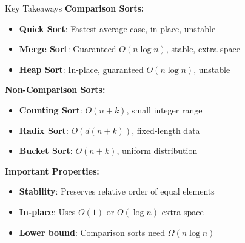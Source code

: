 \documentclass[aspectratio=169]{beamer}
\begin{document}
\begin{frame}{Key Takeaways}
  \textbf{Comparison Sorts:}
  \begin{itemize}
    \item \textbf{Quick Sort}: Fastest average case, in-place, unstable
    \item \textbf{Merge Sort}: Guaranteed $O(n \log n)$, stable, extra space
    \item \textbf{Heap Sort}: In-place, guaranteed $O(n \log n)$, unstable
  \end{itemize}

  \vspace{0.3cm}
  \textbf{Non-Comparison Sorts:}
  \begin{itemize}
    \item \textbf{Counting Sort}: $O(n + k)$, small integer range
    \item \textbf{Radix Sort}: $O(d(n + k))$, fixed-length data
    \item \textbf{Bucket Sort}: $O(n + k)$, uniform distribution
  \end{itemize}

  \vspace{0.3cm}
  \textbf{Important Properties:}
  \begin{itemize}
    \item \textbf{Stability}: Preserves relative order of equal elements
    \item \textbf{In-place}: Uses $O(1)$ or $O(\log n)$ extra space
    \item \textbf{Lower bound}: Comparison sorts need $\Omega(n \log n)$
  \end{itemize}
\end{frame}
\end{document}
